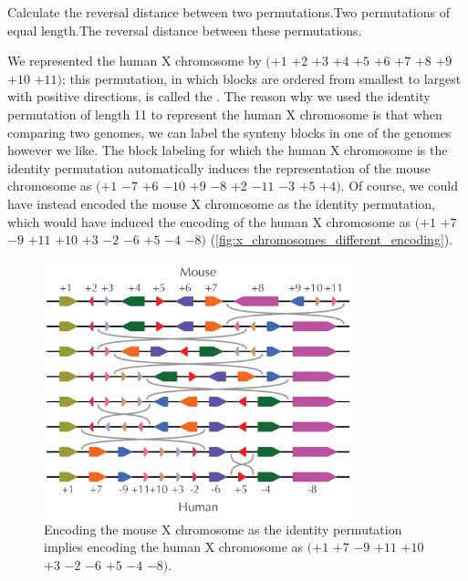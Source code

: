 \begin{problem}{Calculate the reversal distance between two permutations.}{Two permutations of equal length.}{The reversal distance between these permutations.}
\end{problem}

\vspace{-\baselineskip}

\noindent We represented the human X chromosome by $(+1$ $+2$ $+3$ $+4$ $+5$ $+6$ $+7$ $+8$ $+9$ $+10$ $+11)$; this permutation, in which blocks are ordered from smallest to largest with positive directions, is called the . The reason why we used the identity permutation of length 11 to represent the human X chromosome is that when comparing two genomes, we can label the synteny blocks in one of the genomes however we like. The block labeling for which the human X chromosome is the identity permutation automatically induces the representation of the mouse chromosome as $(+1$ $-7$ $+6$ $-10$ $+9$ $-8$ $+2$ $-11$ $-3$ $+5$ $+4)$.   Of course, we could have instead encoded the mouse X chromosome as the identity permutation, which would have induced the encoding of the human X chromosome as $(+1$ $+7$ $-9$ $+11$ $+10$ $+3$ $-2$ $-6$ $+5$ $-4$ $-8)$ (\autoref{fig:x_chromosomes_different_encoding}).\\

\begin{figure}[h]
\centering
\includegraphics[width = 0.8\textwidth]{images/rearrangements/x_chromosomes_different_encoding}
\caption{Encoding the mouse X chromosome as the identity permutation implies encoding the human X chromosome as $(+1$ $+7$ $-9$ $+11$ $+10$ $+3$ $-2$ $-6$ $+5$ $-4$ $-8)$.}
\label{fig:x_chromosomes_different_encoding}
\end{figure}

